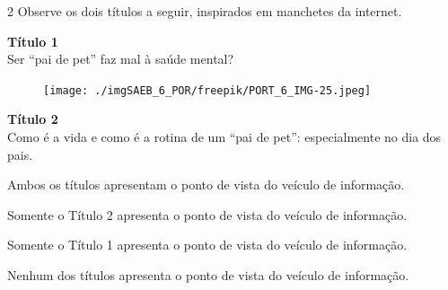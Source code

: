 

\num{2} Observe os dois títulos a seguir, inspirados em manchetes da
internet.

\begin{myquote}

\centering\textbf{Título 1}\\
Ser ``pai de pet'' faz mal à saúde mental?

\begin{figure}[H]
\centering\texttt{[image: ./imgSAEB\_6\_POR/freepik/PORT\_6\_IMG-25.jpeg]}
\end{figure}

\centering\textbf{Título 2}\\
Como é a vida e como é a rotina de um ``pai de pet'': especialmente no dia
dos pais.
\end{myquote}

\begin{escolha}
\item Ambos os títulos apresentam o ponto de vista do veículo de informação.
\item Somente o Título 2 apresenta o ponto de vista do veículo de informação. 
\item Somente o Título 1 apresenta o ponto de vista do veículo de informação.
\item Nenhum dos títulos apresenta o ponto de vista do veículo de informação.
\end{escolha}

